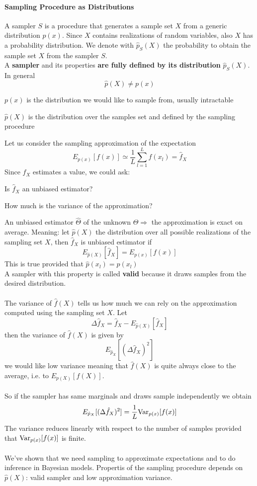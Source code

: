 \documentclass[10pt]{report}
\begin{document}
\paragraph{Sampling Procedure as Distributions} A sampler $S$ is a procedure that generates a sample set $X$ from a generic distribution $p(x)$. Since $X$ contains realizations of random variables, also $X$ has a probability distribution. We denote with $\hat{p}_S(X)$ the probability to obtain the sample set $X$ from the sampler $S$.\\
A \textbf{sampler} and its properties \textbf{are fully defined by its distribution} $\hat{p}_S(X)$. In general
$$\hat{p}(X) \neq p(x)$$
\begin{list}{}{}
	\item $p(x)$ is the distribution we would like to sample from, usually intractable
	\item $\hat{p}(X)$ is the distribution over the samples set and defined by the sampling procedure
\end{list}
Let us consider the sampling approximation of the expectation
$$E_{p(x)}[f(x)]\simeq \frac{1}{L}\sum_{l=1}^L f(x_l) = \hat{f}_X$$
Since $\hat{f}_X$ estimates a value, we could ask:
\begin{list}{}{}
	\item Is $\hat{f}_X$ an unbiased estimator?
	\item How much is the variance of the approximation?
\end{list}
An unbiased estimator $\hat{\Theta}$ of the unknown $\Theta \Rightarrow$ the approximation is exact on average. Meaning: let $\hat{p}(X)$ the distribution over all possible realizations of the sampling set $X$, then $\hat{f}_X$ is unbiased estimator if $$E_{\hat{p}(X)}[\hat{f}_X] = E_{p(x)}[f(x)]$$
This is true provided that $\hat{p}(x_l) = p(x_l)$\\
A sampler with this property is called \textbf{valid} because it draws samples from the desired distribution.\\\\
The variance of $\hat{f}(X)$ tells us how much we can rely on the approximation computed using the sampling set $X$. Let $$\Delta\hat{f}_X = \hat{f}_X - E_{\hat{p}(X)}[\hat{f}_X]$$ then the variance of $\hat{f}(X)$ is given by $$E_{\hat{p}_X}[(\Delta\hat{f}_X)^2]$$
we would like low variance meaning that $\hat{f}(X)$ is quite always close to the average, i.e. to $E_{p(X)}[f(X)]$.\\\\
So if the sampler has same marginals and draws sample independently we obtain $$E_{\hat{p}_X}[(\Delta \hat{f}_X)^2] = \frac{1}{L}\hbox{Var}_{p(x)}[f(x)]$$
The variance reduces linearly with respect to the number of samples provided that $\hbox{Var}_{p(x)}[f(x)]$ is finite.\\\\
We've shown that we need sampling to approximate expectations and to do inference in Bayesian models. Propertis of the sampling procedure depends on $\hat{p}(X)$: valid sampler and low approximation variance.
\end{document}
